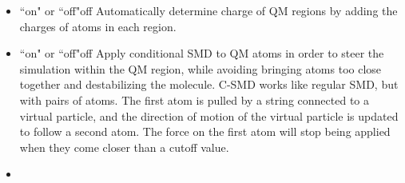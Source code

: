 \begin{itemize}
\item
{}%
{``on" or ``off"}{off}{%
Automatically determine charge of QM regions by adding the charges of 
atoms in each region.
}


\item
{}%
{``on" or ``off"}{off}{%
Apply conditional SMD to QM atoms in order to steer the simulation 
within the QM region, while avoiding bringing atoms too close together 
and destabilizing the molecule. C-SMD works like regular SMD, but 
with pairs of atoms. The first atom is pulled by a string connected 
to a virtual particle, and the direction of motion of the virtual 
particle is updated to follow a second atom. The force on the first 
atom will stop being applied when they come closer than a cutoff value.
}

\item
{}




\end{itemize}

